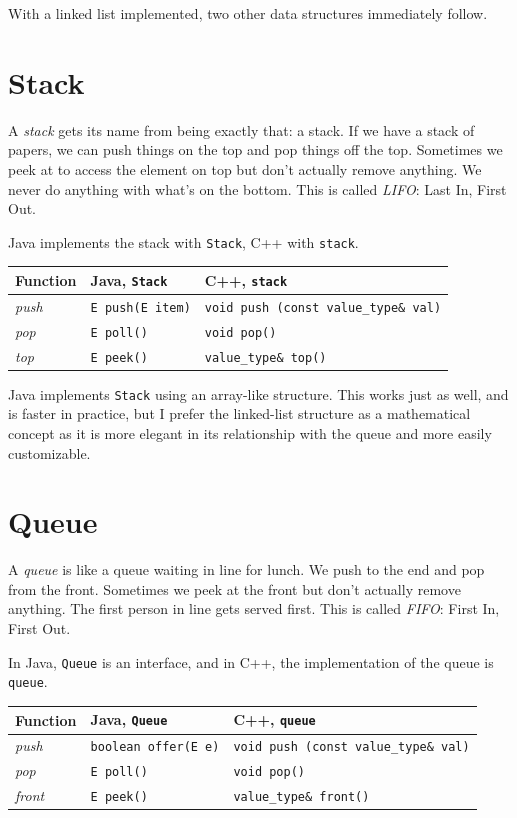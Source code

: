 With a linked list implemented, two other data structures immediately follow.

\section{Stack}

A \textit{stack} gets its name from being exactly that: a stack. If we have a stack of papers, we can push things on the top and pop things off the top. Sometimes we peek at to access the element on top but don't actually remove anything. We never do anything with what's on the bottom. This is called \textit{LIFO}: Last In, First Out.

Java implements the stack with \texttt{Stack}, C++ with \texttt{stack}.

\begin{center}
    \begin{tabular}{ p{5cm} p{5cm} p{5cm} }
	Function	&	Java, \texttt{Stack}	&	C++, \texttt{stack} \\
	\hline
	\textit{push}		&	\texttt{E push(E item)}	&	\texttt{void push (const value\_type\& val)} \\
    \textit{pop}			&	\texttt{E poll()}		&	\texttt{void pop()}	\\
	\textit{top}		&	\texttt{E peek()}		&	\texttt{value\_type\& top()}	\\
    \end{tabular}
\end{center}

Java implements \texttt{Stack} using an array-like structure. This works just as well, and is faster in practice, but I prefer the linked-list structure as a mathematical concept as it is more elegant in its relationship with the queue and more easily customizable.

\section{Queue}

A \textit{queue} is like a queue waiting in line for lunch. We push to the end and pop from the front. Sometimes we peek at the front but don't actually remove anything. The first person in line gets served first. This is called \textit{FIFO}: First In, First Out.

In Java, \texttt{Queue} is an interface, and in C++, the implementation of the queue is \texttt{queue}.

\begin{center}
    \begin{tabular}{ p{5cm} p{5cm} p{5cm} }
	Function	&	Java, \texttt{Queue}	&	C++, \texttt{queue} \\
	\hline
	\textit{push}		&	\texttt{boolean offer(E e)}	&	\texttt{void push (const value\_type\& val)} \\
    \textit{pop}			&	\texttt{E poll()}		&	\texttt{void pop()}	\\
    \textit{front}		&	\texttt{E peek()}		&	\texttt{value\_type\& front()}	\\
    \end{tabular}
\end{center}

